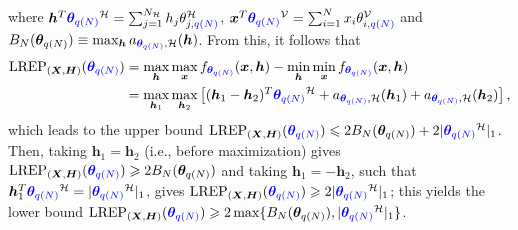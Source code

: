 \documentclass[numbib]{imamat}
\theoremstyle{theorem}
\theoremstyle{lemma}
\theoremstyle{example}
\theoremstyle{corollary}
\theoremstyle{definition}
\theoremstyle{remark}
\theoremstyle{approximation}
\theoremstyle{scheme}
\newcommand{\REP}{\mathrm{LREP}}
\newcommand{\thetaidx}{q(N)}
\newcommand{\thetaN}{\boldsymbol \theta_{\thetaidx}}
\newcommand{\Gam}{B_{N}(\thetaN) }
\newcommand{\ak}[1]{{\color{blue} #1}}
\begin{document}
where \(\boldsymbol h^T \ak{\thetaN}^{\mathcal{H}}=\sum_{j=1}^{N_\mathcal{H}} h_j \theta_{j,\ak{\thetaidx}}^{\mathcal{H}}\), \(\boldsymbol x^T \ak{\thetaN}^{\mathcal{V}}= \sum_{i=1}^{N}x_i \theta_{i,\ak{\thetaidx}}^{\mathcal{V}}\) and \(\Gam\equiv \max_{\boldsymbol h} a_{\ak{\thetaN}, \mathcal{H}} (\boldsymbol h)\).
From this, it follows that
\begin{align*}
\REP_{(\boldsymbol X, \boldsymbol H)}(\ak{\thetaN}) &=  \max_{\boldsymbol h}\max_{\boldsymbol x}f_{\ak{\thetaN}} (\boldsymbol x , \boldsymbol h) -  \min_{\boldsymbol h}\min_{\boldsymbol x}f_{\ak{\thetaN}} (\boldsymbol x , \boldsymbol h)\\
&= \max_{\boldsymbol h_1 }  \max_{\boldsymbol h_2 }\left[ (\boldsymbol h_1 - \boldsymbol h_2)^T  \ak{\thetaN}^{\mathcal{H}}  +   a_{\ak{\thetaN}, \mathcal{H}} (\boldsymbol h_1)  + a_{\ak{\thetaN}, \mathcal{H}} (\boldsymbol h_2)\right],
\end{align*}
which leads to the upper bound \(\REP_{(\boldsymbol X, \boldsymbol H)}(\ak{\thetaN}) \leq 2 \Gam + 2 | \ak{\thetaN}^{\mathcal{H}} |_1\). Then, taking \(\boldsymbol h_1=\boldsymbol h_2\) (i.e., before maximization) gives \(\REP_{(\boldsymbol X, \boldsymbol H)}(\ak{\thetaN}) \geq 2\Gam\) and taking \(\boldsymbol h_1=-\boldsymbol h_2\), such that \(\boldsymbol h_1^T \ak{\thetaN}^{\mathcal{H}} = |\ak{\thetaN}^{\mathcal{H}}|_1\), gives \(\REP_{(\boldsymbol X, \boldsymbol H)}(\ak{\thetaN}) \geq 2|\ak{\thetaN}^{\mathcal{H}}|_1\); this yields the lower bound \(\REP_{(\boldsymbol X, \boldsymbol H)}(\ak{\thetaN})\geq 2\max\{\Gam, |\ak{\thetaN}^{\mathcal{H}} |_1\}\).
\end{document}
